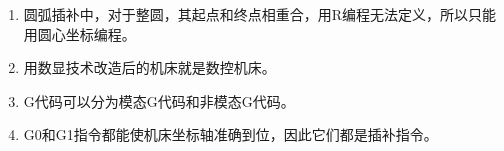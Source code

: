 \documentclass[12pt,twocolumn,landscape,UTF8,twoside]{ctexart}
\begin{document}
\begin{spacing}{1.3}
\begin{enumerate} [1、]
\item 圆弧插补中，对于整圆，其起点和终点相重合，用R编程无法定义，所以只能用圆心坐标编程。
\item 用数显技术改造后的机床就是数控机床。
\item G代码可以分为模态G代码和非模态G代码。
\item G0和G1指令都能使机床坐标轴准确到位，因此它们都是插补指令。
	

\end{enumerate}
\end{spacing}
\end{document}

